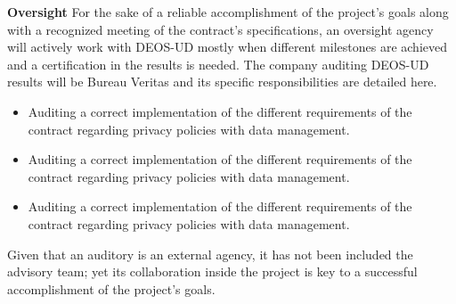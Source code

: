 \textbf{Oversight }
\newline
\newline
For the sake of a reliable accomplishment of the project’s goals along with a recognized meeting of the contract’s specifications, an oversight agency will actively work with DEOS-UD mostly when different milestones are achieved and a certification in the results is needed. The company auditing DEOS-UD results will be Bureau Veritas and its specific responsibilities are detailed here.
 \begin{itemize}
	\item 	Auditing a correct implementation of the different requirements of the contract regarding privacy policies with data management. 
	\item 	Auditing a correct implementation of the different requirements of the contract regarding privacy policies with data management. 
	\item 	Auditing a correct implementation of the different requirements of the contract regarding privacy policies with data management. 
\end{itemize}
Given that an auditory is an external agency, it has not been included the advisory team; yet its collaboration inside the project is key to a successful accomplishment of the project’s goals. 
